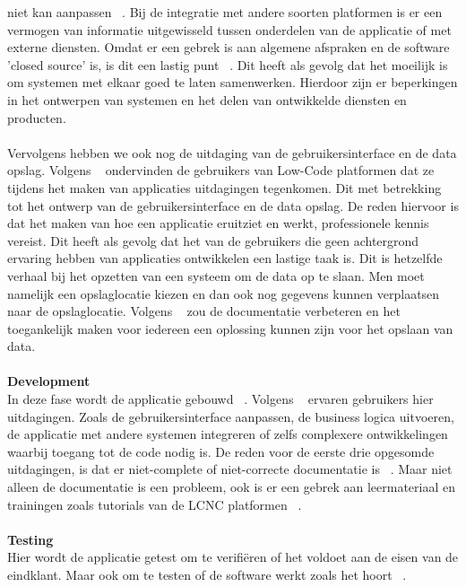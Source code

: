 niet kan aanpassen ~\autocite{Rokis_2022}. Bij de integratie met andere soorten platformen is er een vermogen van informatie uitgewisseld tussen onderdelen van de applicatie 
of met externe diensten. Omdat er een gebrek is aan algemene afspraken en de software 'closed source' is, is dit een lastig punt ~\autocite{Rokis_2022}.
 Dit heeft als gevolg dat het moeilijk is om systemen met elkaar goed te laten samenwerken. 
 Hierdoor zijn er beperkingen in het ontwerpen van systemen en het delen van ontwikkelde diensten en producten.\\\\ 
 Vervolgens hebben we ook nog de uitdaging van de gebruikersinterface en de data opslag. Volgens ~\textcite{Rokis_2022} 
 ondervinden de gebruikers van Low-Code platformen dat ze tijdens het maken van applicaties uitdagingen tegenkomen. Dit met betrekking tot het ontwerp 
 van de gebruikersinterface en de data opslag. De reden hiervoor is dat het maken van hoe een applicatie eruitziet en werkt, professionele kennis vereist. 
 Dit heeft als gevolg dat het van de gebruikers die geen achtergrond ervaring hebben van applicaties ontwikkelen een lastige taak is. 
 Dit is hetzelfde verhaal bij het opzetten van een systeem om de data op te slaan. Men moet namelijk een opslaglocatie kiezen en dan ook nog gegevens 
 kunnen verplaatsen naar de opslaglocatie. Volgens ~\textcite{Rokis_2022} zou de documentatie verbeteren en het toegankelijk maken voor iedereen 
 een oplossing kunnen zijn voor het opslaan van data.
\\
\\
\textbf{Development}
\\
In deze fase wordt de applicatie gebouwd ~\autocite{Ghumatkar_2023}. 
Volgens ~\textcite{Rokis_2022} ervaren gebruikers hier uitdagingen. Zoals de gebruikersinterface aanpassen, de business logica uitvoeren, de applicatie met andere systemen integreren of zelfs complexere ontwikkelingen waarbij toegang tot de code nodig is. 
De reden voor de eerste drie opgesomde uitdagingen, is dat er niet-complete of niet-correcte documentatie is ~\autocite{Rokis_2022}. 
Maar niet alleen de documentatie is een probleem, ook is er een gebrek aan leermateriaal en trainingen zoals tutorials van de LCNC platformen ~\autocite{Rokis_2022}.
\\
\\
\textbf{Testing}
\\
Hier wordt de applicatie getest om te verifiëren of het voldoet aan de eisen van de eindklant. Maar ook om te testen of de software werkt zoals het hoort ~\autocite{Ghumatkar_2023}. 
